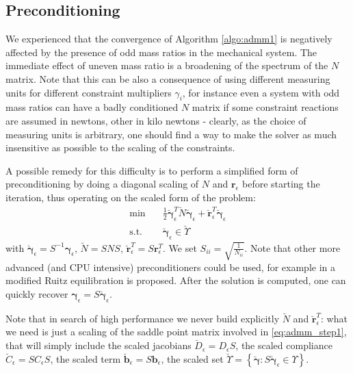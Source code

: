 \documentclass[AMA,STIX1COL]{WileyNJD-v2}
\newcommand{\vect}[1]{\bm{#1}}
\begin{document}
\subsection{Preconditioning}

We experienced that the convergence of Algorithm \ref{algo:admm1} is negatively affected by the presence of odd mass ratios in the mechanical system. The immediate effect of uneven mass ratio is a broadening of the spectrum of the $N$ matrix. Note that this can be also a consequence of using different measuring units for different constraint multipliers $\gamma_i$, for instance even a system with odd mass ratios can have a badly conditioned $N$ matrix if some constraint reactions are assumed in newtons, other in kilo newtons - clearly, as the choice of measuring units is arbitrary, one should find a way to make the solver as much insensitive as possible to the scaling of the constraints. 

A possible remedy for this difficulty is to perform a simplified form of preconditioning by doing a diagonal scaling of $N$ and $\vect{r}_\epsilon$ before starting the iteration, thus operating on the scaled form of the problem:
%
\begin{align}
	\text{min} \quad & \frac{1}{2} \breve{\vect{\gamma}}_\epsilon^T \breve{N} \breve{\vect{\gamma}}_\epsilon + \breve{\vect{r}}^T_\epsilon \breve{\vect{\gamma}}_\epsilon \\
	\text{s.t.} \quad & \breve{\vect{\gamma}}_\epsilon \in \breve{\Upsilon} 
	\label{eq:ChronoCCP_min_scaled}
\end{align}
%
with $\breve{\vect{\gamma}}_\epsilon = S^{-1} \vect{\gamma}_\epsilon$, $\breve{N} = S N S$, 
$\breve{\vect{r}}^T_\epsilon = S \vect{r}^T_\epsilon$. 
We set $S_{ii} = \sqrt{\frac{1}{N_{ii}}}$. 
Note that other more advanced (and CPU intensive) preconditioners could be used, for example in \cite{Stellato2020} a modified Ruitz equilibration is proposed.  
After the solution is computed, one can quickly recover $\vect{\gamma}_\epsilon = S \breve{\vect{\gamma}}_\epsilon$. 

Note that in search of high performance we never build explicitly $\breve{N}$ and $\breve{\vect{r}}^T_\epsilon$: what we need is just a scaling of the saddle point matrix involved in \eqref{eq:admm_step1}, that will simply include the scaled jacobians
$\breve{D}_\epsilon = D_\epsilon S$, the scaled compliance
$\breve{C}_\epsilon = S C_\epsilon S$,  the scaled term 
$\breve{\vect{b}}_\epsilon = S \vect{b}_\epsilon$, the scaled set
$\breve{\Upsilon} = \left\{ \breve{\vect{\gamma}} : S \breve{\vect{\gamma}}_\epsilon \in \Upsilon  \right\}$.
\end{document}
